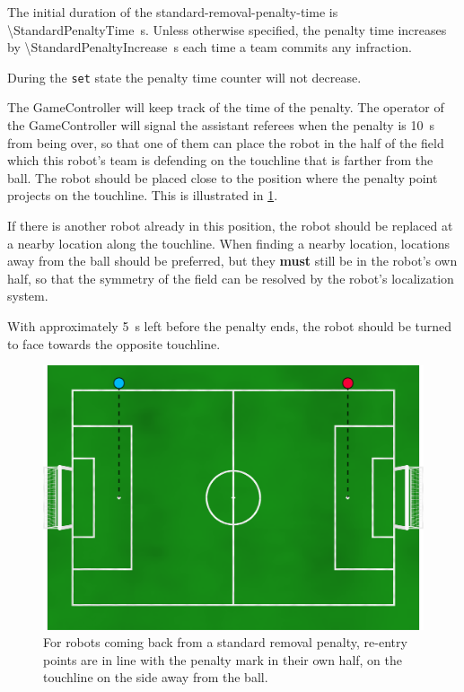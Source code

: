 The initial duration of the standard-removal-penalty-time is \qty{\StandardPenaltyTime}{\second}.
Unless otherwise specified, the penalty time increases by \qty{\StandardPenaltyIncrease}{\second} each time a team commits any infraction.

During the \texttt{set} state the penalty time counter will not decrease.

The GameController will keep track of the time of the penalty. The operator of the GameController will signal the assistant referees when the penalty is \qty{10}{\second} from being over, so that one of them can place the robot in the half of the field which this robot's team is defending on the touchline that is farther from the ball. The robot should be placed close to the position where the penalty point projects on the touchline. This is illustrated in \cref{fig:penalty_re-entry_points}.

If there is another robot already in this position, the robot should be replaced at a nearby location along the touchline. When finding a nearby location, locations away from the ball should be preferred, but they \textbf{must} still be in the robot's own half, so that the symmetry of the field can be resolved by the robot's localization system.

With approximately \qty{5}{\second} left before the penalty ends, the robot should be turned to face towards the opposite touchline.

\begin{figure}[t]
\centerline{\includegraphics[width=\columnwidth]{figs/penalty_re-entry_points_2020.png}}
\caption{For robots coming back from a standard removal penalty, re-entry points are in line with the penalty mark in their own half, on the touchline on the side away from the ball.}
\label{fig:penalty_re-entry_points}
\end{figure}

